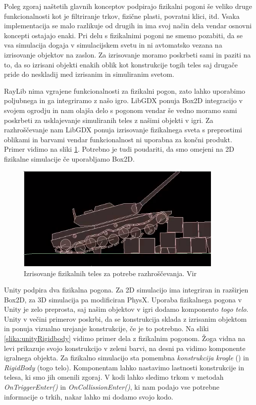 \documentclass[12pt,a4paper,twoside]{book}
\begin{document}
Poleg zgoraj naštetih glavnih konceptov podpirajo fizikalni pogoni še veliko druge funkcionalnosti kot je filtriranje trkov, fizične plasti, povratni klici, itd. Vsaka implementacija se malo razlikuje od drugih in ima svoj način dela vendar osnovni koncepti ostajajo enaki. Pri delu s fizikalnimi pogoni ne smemo pozabiti, da se vsa simulacija dogaja v simulacijskem svetu in ni avtomatsko vezana na izrisovanje objektov na zaslon. Za izrisovanje moramo poskrbeti sami in paziti na to, da so izrisani objekti enakih oblik kot konstrukcije togih teles saj drugače pride do neskladij med izrisanim in simuliranim svetom.

RayLib nima vgrajene funkcionalnosti za fizikalni pogon, zato lahko uporabimo poljubnega in ga integriramo z našo igro. LibGDX ponuja Box2D integracijo v svojem ogrodju in nam olajša delo s pogonom vendar še vedno moramo sami poskrbeti za usklajevanje simuliranih teles z našimi objekti v igri. Za razhroščevanje nam LibGDX ponuja izrisovanje fizikalnega sveta s preprostimi oblikami in barvami vendar funkcionalnost ni uporabna za končni produkt. Primer vidimo na sliki \ref{slika:box2dDebug}. Potrebno je tudi poudariti, da smo omejeni na 2D fizikalne simulacije če uporabljamo Box2D.

\begin{figure}[h]
	\centering
	\includegraphics[width=10cm]{box2dDebug}
	\caption{Izrisovanje fizikalnih teles za potrebe razhroščevanja. Vir \cite{box2dTank}}
	\label{slika:box2dDebug}
\end{figure}

Unity podpira dva fizikalna pogona. Za 2D simulacijo ima integriran in razširjen Box2D, za 3D simulacija pa modificiran PhysX. Uporaba fizikalnega pogona v Unity je zelo preprosta, saj našim objektov v igri dodamo komponento \textit{togo telo}. Unity v večini primerov poskrbi, da se konstrukcija sklada z izrisanim objektom in ponuja vizualno urejanje konstrukcije, če je to potrebno. Na sliki \ref{slika:unityRigidbody} vidimo primer dela z fizikalnim pogonom. Žoga vidna na levi prikazuje svojo konstrukcijo v zeleni barvi, na desni pa vidimo komponente igralnega objekta. Za fizikalno simulacijo sta pomembna \textit{konstrukcija krogle} () in \textit{RigidBody} (togo telo). Komponentam lahko nastavimo lastnosti konstrukcije in telesa, ki smo jih omenili zgoraj. V kodi lahko sledimo trkom v metodah \textit{OnTriggerEnter()} in \textit{OnCollissionEnter()}, ki nam podajo vse potrebne informacije o trkih, nakar lahko mi dodamo svojo kodo.
\end{document}
